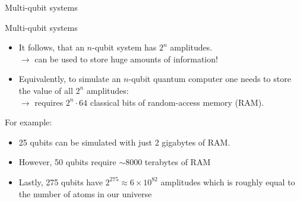 \documentclass[10pt]{beamer}
\begin{document}
{\begin{frame}[fragile]{Multi-qubit systems}
\begin{equation}
\end{equation}


\end{frame}
}

{
\begin{frame}[fragile]{Multi-qubit systems}

\begin{itemize}
\item It follows, that an $n$-qubit system has $2^n$ amplitudes.\\
$\rightarrow$ can be used to store huge amounts of information!

\item Equivalently, to simulate an $n$-qubit quantum computer one needs to store the value of all $2^n$ amplitudes:\\
$\rightarrow$ requires $2^n\cdot 64$ classical bits of random-access memory (RAM).
\end{itemize}

For example:
\begin{itemize}
\item 25 qubits can be simulated with just 2 gigabytes of RAM.
\item However, 50 qubits require $\sim$8000 terabytes of RAM
\item Lastly, 275 qubits have $2^{275} \approx 6\times 10^{82}$ amplitudes which is roughly equal to the number of atoms in our universe
\end{itemize}

\end{frame}
}
\end{document}
